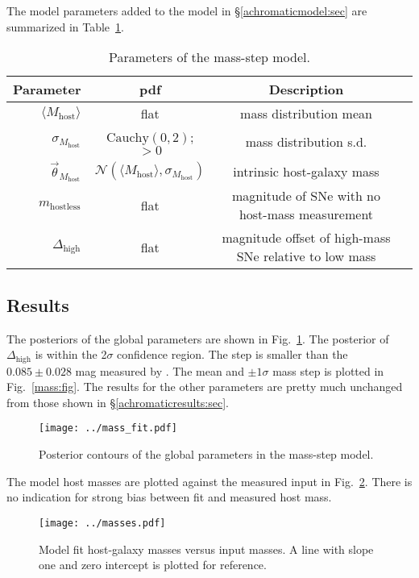 \documentclass{aastex61}   	%
\begin{document}
The  model parameters added to the model in \S\ref{achromaticmodel:sec}
are summarized in Table~\ref{mass:tab}.
\begin{table}
\begin{center}
\caption{Parameters of the mass-step model.\label{mass:tab}}
\begin{tabular}{rccc}
\hline
Parameter & pdf & Description\\ \hline
$\langle M_{\text{host}} \rangle$ &flat& mass distribution mean \\
$\sigma_{M_{\text{host}}}$ &$\text{Cauchy}(0,2)$; $>0$& mass distribution s.d. \\
$\vec{\theta}_{M_{\text{host}}}$ &$\mathcal{N}(\langle M_{\text{host}} \rangle,\sigma_{M_{\text{host}}})$ &intrinsic host-galaxy mass\\
$m_{\mathrm{hostless}}$ & flat & magnitude of SNe with no host-mass measurement\\
$\Delta_{\mathrm{high}}$ & flat & magnitude offset of high-mass SNe relative to low mass\\
\hline
\end{tabular}
\end{center}
\end{table}



\subsection{Results}

The posteriors of the global parameters are shown in Fig.~\ref{mass_fit:fig}.  The posterior of $\Delta_{\text{high}}$
is within the 2$\sigma$ confidence region.  The step is smaller than the $0.085 \pm 0.028$ mag measured by \citet{2013ApJ...770..108C}. 
The mean and $\pm1\sigma$ mass step is plotted in Fig.~\ref{mass:fig}.  The results for the other parameters are pretty much unchanged from
those shown in \S\ref{achromaticresults:sec}.

\begin{figure}[htbp] %
   \centering
   \texttt{[image: ../mass\_fit.pdf]}
   \caption{Posterior contours of the global parameters in the mass-step model.
   \label{mass_fit:fig}}
\end{figure}

The  model host masses are plotted  against the measured input in  Fig.~\ref{masses:fig}.
There is no indication for strong bias between fit and measured host mass.


\begin{figure}[htbp] %
   \centering
   \texttt{[image: ../masses.pdf]}
   \caption{Model fit host-galaxy masses versus input masses.  A line with slope one and zero intercept is plotted for reference.
   \label{masses:fig}}
\end{figure}




\end{document}
